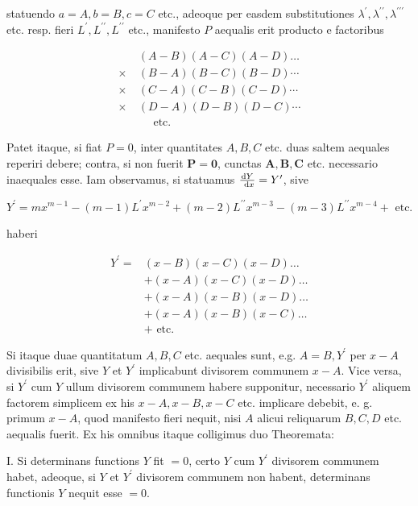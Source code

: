 \documentclass[twoside,12pt, showframe]{memoir}
\let\oldfrac\frac
\def\frac#1#2{\mathchoice{\tfrac{#1}{#2}}{\oldfrac{#1}{#2}}{\genfrac{}{}{}{2}{#1}{#2\mathstrut}}{\genfrac{}{}{}{3}{#1}{#2\mathstrut}}}
\begin{document}
statuendo \(a=A, b=B, c=C\) etc., adeoque per easdem substitutiones \(\lambda^{\prime}, \lambda^{\prime \prime}, \lambda^{\prime \prime \prime}\) etc. resp. fieri \(L^{\prime}, L^{\prime \prime}, L^{\prime \prime}\) etc., manifesto \(P\) aequalis erit producto e factoribus

\[
\begin{aligned}
& (A-B)(A-C)(A-D) \ldots \\
\times & (B-A)(B-C)(B-D) \cdots \\
\times & (C-A)(C-B)(C-D) \cdots \\
\times & (D-A)(D-B)(D-C) \cdots \\
\quad & \quad \text { etc. }
\end{aligned}
\]

Patet itaque, si fiat \(P=0\), inter quantitates \(A, B, C\) etc. duas saltem aequales reperiri debere; contra, si non fuerit \(\boldsymbol{P}=\mathbf{0}\), cunctas \(\boldsymbol{A}, \boldsymbol{B}, \boldsymbol{C}\) etc. necessario inaequales esse. Iam observamus, si statuamus \(\frac{\mathrm{d} Y}{\mathrm{~d} x}=Y^{\prime}\), sive

\[
Y^{\prime}=m x^{m-1}-(m-1) L^{\prime} x^{m-2}+(m-2) L^{\prime \prime} x^{m-3}-(m-3) L^{\prime \prime} x^{m-4}+\text { etc. }
\]

haberi

\[
\begin{aligned}
Y^{\prime}= & (x-B)(x-C)(x-D) \ldots \\
& +(x-A)(x-C)(x-D) \ldots \\
& +(x-A)(x-B)(x-D) \ldots \\
& +(x-A)(x-B)(x-C) \ldots \\
& + \text { etc. }
\end{aligned}
\]

Si itaque duae quantitatum \(A, B, C\) etc. aequales sunt, e.g. \(A=B, Y^{\prime}\) per \(x-A\) divisibilis erit, sive \(Y\) et \(Y^{\prime}\) implicabunt divisorem communem \(x-A\). Vice versa, si \(Y^{\prime}\) cum \(Y\) ullum divisorem communem habere supponitur, necessario \(Y^{\prime}\) aliquem factorem simplicem ex his \(x-A, x-B, x-C\) etc. implicare debebit, e. g. primum \(x-A\), quod manifesto fieri nequit, nisi \(A\) alicui reliquarum \(B, C, D\) etc. aequalis fuerit. Ex his omnibus itaque colligimus duo Theoremata:

I. Si determinans functions \(Y\) fit \(=0\), certo \(Y\) cum \(Y^{\prime}\) divisorem communem habet, adeoque, si \(Y\) et \(Y^{\prime}\) divisorem communem non habent, determinans functionis \(Y\) nequit esse \(=0\).
\end{document}
